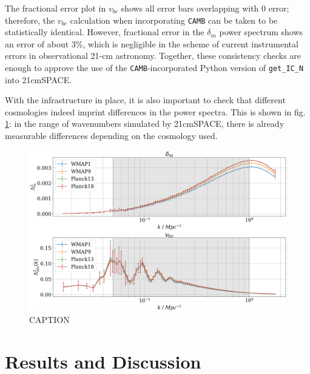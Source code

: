 \documentclass[floats,floatfix,showpacs,amssymb,prd,superscriptaddress,nofootinbib]{revtex4-2} %
\newcommand{\code}{\texttt}
\newcommand{\red}{\textcolor{red}}
\begin{document}
\newpage
The fractional error plot in $v_{bc}$ shows all error bars overlapping with $0$ error; therefore, the $v_{bc}$ calculation when incorporating \code{CAMB} can be taken to be statistically identical. However, fractional error in the $\delta_m$ power spectrum shows an error of about $3 \%$, 
which is negligible in the scheme of current instrumental errors in observational 21-cm astronomy. Together, these consistency checks are enough to approve the use of the \code{CAMB}-incorporated Python version of \code{get\_IC\_N} into 21cmSPACE.

With the infrastructure in place, it is also important to check that different cosmologies indeed imprint differences in the power spectra. This is shown in fig. \ref{fig:compare_cosmologies_averaged_IC_power_spectra}: in the range of wavenumbers simulated by 21cmSPACE, there is already measurable differences depending on the cosmology used.

\begin{figure}[H]
    \centering
    \includegraphics[width=0.9\columnwidth]{images/ic_power_spectra/compare_cosmologies_averaged_power_spectra.png}
    \caption{CAPTION}
    \label{fig:compare_cosmologies_averaged_IC_power_spectra}
\end{figure}

\newpage
\section{Results and Discussion}
\end{document}
